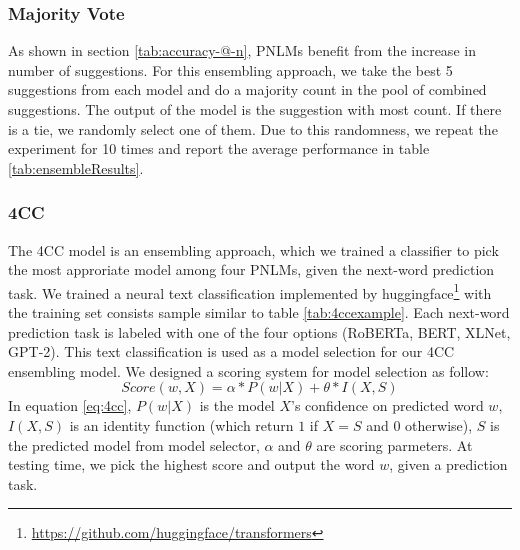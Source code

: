 \documentclass[11pt]{article}
\begin{document}
\subsubsection{Majority Vote}

As shown in section \ref{tab:accuracy-@-n}, PNLMs benefit from the increase in number of suggestions. For this ensembling approach, we take the best 5 suggestions from each model and do a majority count in the pool of combined suggestions. The output of the model is the suggestion with most count. If there is a tie, we randomly select one of them. Due to this randomness, we repeat the experiment for 10 times and report the average performance in table \ref{tab:ensembleResults}.

\subsubsection{4CC} \label{sec:4cc}

The 4CC model is an ensembling approach, which we trained a classifier to pick the most approriate model among four PNLMs, given the next-word prediction task. We trained a neural text classification implemented by huggingface\footnote{\url{https://github.com/huggingface/transformers}} with the training set consists sample similar to table \ref{tab:4ccexample}. Each next-word prediction task is labeled with one of the four options (RoBERTa, BERT, XLNet, GPT-2). This text classification is used as a model selection for our 4CC ensembling model. We designed a scoring system for model selection as follow:
\begin{equation} \label{eq:4cc}
	Score(w, X) = \alpha * P(w|X) + \theta * I (X, S)
\end{equation}
In equation \ref{eq:4cc}, $P(w|X)$ is the model $X$'s confidence on predicted word $w$, $I(X, S)$ is an identity function (which return $1$ if $X = S$ and $0$ otherwise), $S$ is the predicted model from model selector, $\alpha$ and $\theta$ are scoring parmeters.  
At testing time, we pick the highest score and output the word $w$, given a prediction task.  

\begin{table}
    \centering
    \caption{An example of tranining data for the 4CC model. Class can be one of the four option: RoBERTa, BERT, XLNet, GPT-2}
    \label{tab:4ccexample}
\end{table}
\end{document}
